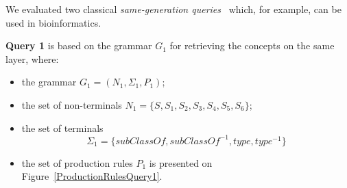 


We evaluated two classical \emph{same-generation queries}~\cite{FndDB} which, for example, can be used in bioinformatics.

\textbf{Query 1} is based on the grammar $G_1$ for retrieving the concepts on the same layer, where:
\begin{itemize}
	\item the grammar $G_1 = (N_1, \Sigma_1, P_1)$;
	\item the set of non-terminals $N_1 = \{S,S_1,S_2,S_3,S_4,S_5,S_6\}$;
	\item the set of terminals \[\Sigma_1 = \{subClassOf, subClassOf^{-1}, type, type^{-1}\}\]
	\item the set of production rules $P_1$ is presented on Figure~\ref{ProductionRulesQuery1}.
\end{itemize}

